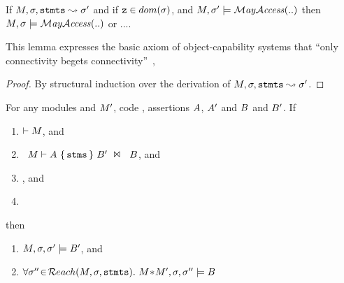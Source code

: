 \begin{lemma}
\label{lemma:connectivity}
If $M, \sigma, {\textrm{\ttfamily{stmts}}} \leadsto \sigma'$ and if ${{\textrm{\ttfamily{z}}}}\in dom(\sigma)$, and 
$M, \sigma' \models \mathcal{M}\textrm{\textit{ay}}{\mathcal{A}}\textrm{\textit{ccess}}(..)$ then
$M, \sigma  \models \mathcal{M}\textrm{\textit{ay}}{\mathcal{A}}\textrm{\textit{ccess}}(..)$ or ....
\end{lemma}

This lemma expresses the basic axiom of object-capability
systems that ``only connectivity begets connectivity''~\cite{MillerPhD},
\begin{proof}
By structural induction over the derivation of $M, \sigma, {\textrm{\ttfamily{stmts}}} \leadsto \sigma'$.
\end{proof}

\begin{theorem}
\label{lemma:hl:soundness}
 For any modules  \M and $M'$, code , assertions $A$, $A'$ and $B$ and $B'$. 
If 
\begin{enumerate}
\item   
$\vdash M$, and 
\item   \ ${{M}\vdash {\ensuremath {A}}\ \{\, {{\textrm{\ttfamily{stms}}}}\, \}\ {B'}\ \Join\ \ {B} }$, and 
\item
\sdJ{$\M, \sigma \models \A$}, and 
\item
{}
\end{enumerate}
then
\begin{enumerate} 
\item
$M, \sigma, \sigma' \models B'$,  and
\item
$\forall {\sigma''}\!\in\!{\mathcal{R}each}(M,\sigma,{{\textrm{\ttfamily{stmts}}}}).\ M\!*\!M', \sigma, {\sigma''} \models B   $
\end{enumerate}
\end{theorem}

